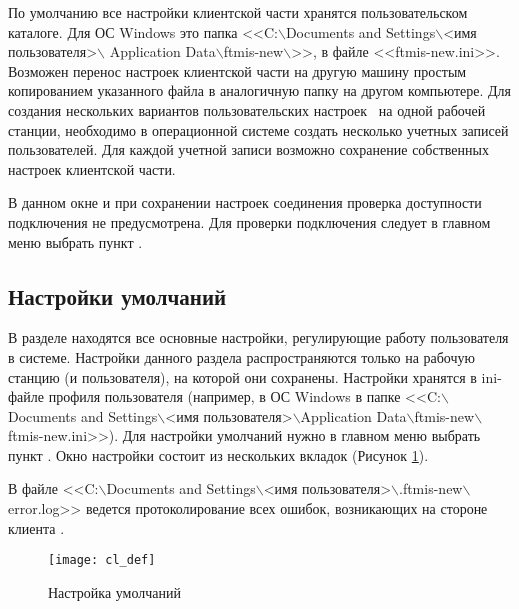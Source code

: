 \begin{prim}
 По умолчанию все настройки клиентской части хранятся пользовательском каталоге. Для ОС Windows это папка <<C:$\backslash$Documents and Settings$\backslash$<имя пользователя>$\backslash$ Application Data$\backslash$ftmis-new$\backslash$>>, в файле <<ftmis-new.ini>>. Возможен перенос настроек клиентской части на другую машину простым копированием указанного файла в аналогичную папку на другом компьютере. Для создания нескольких вариантов пользовательских настроек \tmis~на одной рабочей станции, необходимо в операционной системе создать несколько учетных записей пользователей. Для каждой учетной записи возможно сохранение собственных настроек клиентской части.
\end{prim}

\begin{vnim}
 В данном окне и при сохранении настроек соединения проверка доступности подключения не предусмотрена. Для проверки подключения следует в главном меню выбрать пункт .
\end{vnim}

\subsection{Настройки умолчаний}

В разделе  находятся все основные настройки, регулирующие работу пользователя в системе. Настройки данного раздела распространяются только на рабочую станцию (и пользователя), на которой они сохранены. Настройки хранятся в ini-файле профиля пользователя (например, в ОС Windows в папке <<C:$\backslash$Documents and Settings$\backslash$<имя поль\-зо\-ва\-те\-ля>$\backslash$Application Data$\backslash$ftmis-new$\backslash$ftmis-new.ini>>). Для настройки умолчаний нужно в главном меню выбрать пункт . Окно настройки состоит из нескольких вкладок (Рисунок \ref{img_cl_def}).

\begin{prim}
 В файле <<C:$\backslash$Documents and Settings$\backslash$<имя поль\-зо\-ва\-те\-ля>$\backslash$.ftmis-new$\backslash$error.log>> ведется протоколирование всех ошибок, возникающих на стороне клиента \tmis.
\end{prim}

\begin{figure}[ht]\centering
 \texttt{[image: cl\_def]}
 \caption{Настройка умолчаний}
 \label{img_cl_def}
\end{figure} 

